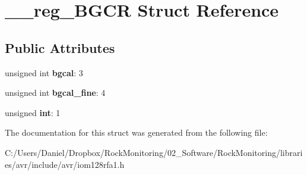 \hypertarget{struct____reg___b_g_c_r}{}\section{\+\_\+\+\_\+reg\+\_\+\+B\+G\+CR Struct Reference}
\label{struct____reg___b_g_c_r}
\subsection*{Public Attributes}
\begin{DoxyCompactItemize}
\item 
unsigned int {\bfseries bgcal}\+: 3\hypertarget{struct____reg___b_g_c_r_ae20ab036542119904c726f2de60485b6}{}\label{struct____reg___b_g_c_r_ae20ab036542119904c726f2de60485b6}

\item 
unsigned int {\bfseries bgcal\+\_\+fine}\+: 4\hypertarget{struct____reg___b_g_c_r_a0091ff410a1abb7a733d262b3f06a351}{}\label{struct____reg___b_g_c_r_a0091ff410a1abb7a733d262b3f06a351}

\item 
unsigned {\bfseries int}\+: 1\hypertarget{struct____reg___b_g_c_r_ae7acdc872143e01d57d8016a028dd8f0}{}\label{struct____reg___b_g_c_r_ae7acdc872143e01d57d8016a028dd8f0}

\end{DoxyCompactItemize}


The documentation for this struct was generated from the following file\+:\begin{DoxyCompactItemize}
\item 
C\+:/\+Users/\+Daniel/\+Dropbox/\+Rock\+Monitoring/02\+\_\+\+Software/\+Rock\+Monitoring/libraries/avr/include/avr/iom128rfa1.\+h\end{DoxyCompactItemize}
